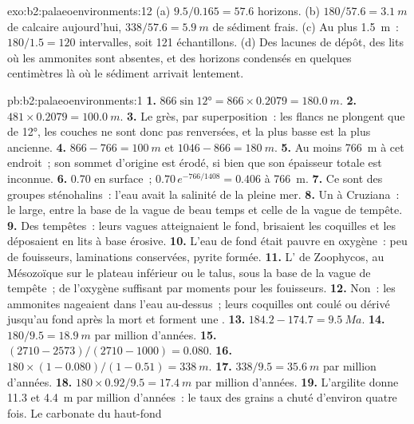 \begin{solution}{exo:b2:palaeoenvironments:12}
(a) $9.5/0.165 = 57.6$ horizons. (b) $180/57.6 = \qty{3.1}{m}$ de calcaire aujourd'hui, $338/57.6 =
\qty{5.9}{m}$ de sédiment frais. (c) Au plus \qty{1.5}{m}~: $180/1.5 = 120$ intervalles, soit 121
échantillons. (d) Des lacunes de dépôt, des lits où les ammonites sont absentes, et des horizons condensés en
quelques centimètres là où le sédiment arrivait lentement.
\end{solution}

\begin{solution}{pb:b2:palaeoenvironments:1}
\textbf{1.} $866 \sin \ang{12} = 866 \times 0.2079 = \qty{180.0}{m}$.
\textbf{2.} $481 \times 0.2079 = \qty{100.0}{m}$. \textbf{3.} Le grès, par
superposition~: les flancs ne plongent que de \ang{12}, les couches ne sont donc
pas renversées, et la plus basse est la plus ancienne. \textbf{4.}
$866 - 766 = \qty{100}{m}$ et $1046 - 866 = \qty{180}{m}$. \textbf{5.} Au moins
\qty{766}{m} à cet endroit~; son sommet d'origine est érodé, si bien que son
épaisseur totale est inconnue. \textbf{6.} 0.70 en surface~;
$0.70\,e^{-766/1408} = 0.406$ à \qty{766}{m}. \textbf{7.} Ce sont des groupes sténohalins~:
l'eau avait la salinité de la pleine mer. \textbf{8.} Un 
à Cruziana~: le large, entre la base de la vague de beau temps et celle de
la vague de tempête. \textbf{9.} Des tempêtes~: leurs vagues atteignaient
le fond, brisaient les coquilles et les déposaient en lits à base érosive.
\textbf{10.} L'eau de fond était pauvre en oxygène~: peu de fouisseurs,
laminations conservées, pyrite formée. \textbf{11.} L' de Zoophycos,
au Mésozoïque sur le plateau inférieur ou le talus, sous la base de la
vague de tempête~; de l'oxygène suffisant par moments pour les fouisseurs.
\textbf{12.} Non~: les ammonites nageaient dans l'eau au-dessus~; leurs
coquilles ont coulé ou dérivé jusqu'au fond après la mort et forment une
. \textbf{13.} $184.2 - 174.7 = \qty{9.5}{Ma}$. \textbf{14.}
$180/9.5 = \qty{18.9}{m}$ par million d'années. \textbf{15.}
$(2710 - 2573)/(2710 - 1000) = 0.080$. \textbf{16.} $180 \times (1 - 0.080)/(1 - 0.51) = \qty{338}{m}$.
\textbf{17.} $338/9.5 = \qty{35.6}{m}$ par million d'années.
\textbf{18.} $180 \times 0.92/9.5 = \qty{17.4}{m}$ par million d'années.
\textbf{19.} L'argilite donne 11.3 et \qty{4.4}{m} par million d'années~:
le taux des grains a chuté d'environ quatre fois. Le carbonate du haut-fond

\end{solution}
